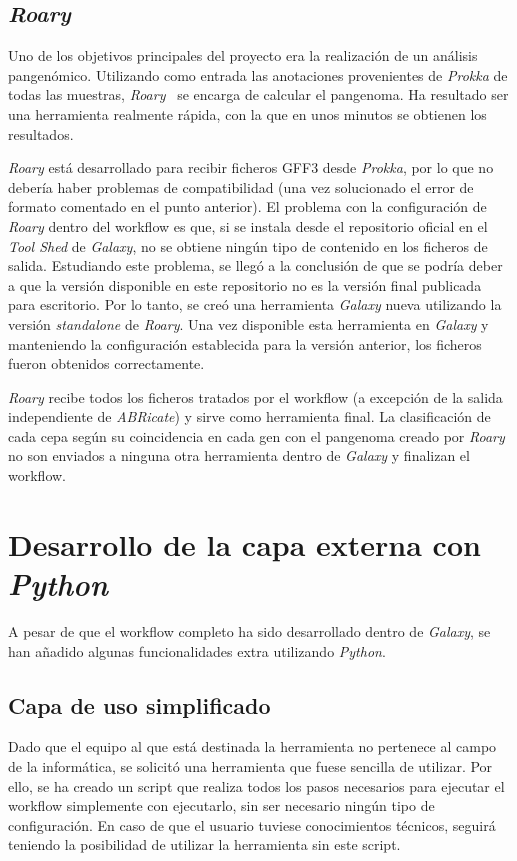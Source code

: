 \subsection{\itshape{Roary}}
Uno de los objetivos principales del proyecto era la realización de un análisis pangenómico. Utilizando como entrada las anotaciones provenientes de \textit{Prokka} de todas las muestras, \textit{Roary}~\cite{Page2015} se encarga de calcular el pangenoma. Ha resultado ser una herramienta realmente rápida, con la que en unos minutos se obtienen los resultados.

\textit{Roary} está desarrollado para recibir ficheros GFF3 desde \textit{Prokka}, por lo que no debería haber problemas de compatibilidad (una vez solucionado el error de formato comentado en el punto anterior). El problema con la configuración de \textit{Roary} dentro del workflow es que, si se instala desde el repositorio oficial en el \textit{Tool Shed} de \textit{Galaxy}, no se obtiene ningún tipo de contenido en los ficheros de salida. Estudiando este problema, se llegó a la conclusión de que se podría deber a que la versión disponible en este repositorio no es la versión final publicada para escritorio. Por lo tanto, se creó una herramienta \textit{Galaxy} nueva utilizando la versión \textit{standalone} de \textit{Roary}. Una vez disponible esta herramienta en \textit{Galaxy} y manteniendo la configuración establecida para la versión anterior, los ficheros fueron obtenidos correctamente.

\textit{Roary} recibe todos los ficheros tratados por el workflow (a excepción de la salida independiente de \textit{ABRicate}) y sirve como herramienta final. La clasificación de cada cepa según su coincidencia en cada gen con el pangenoma creado por \textit{Roary} no son enviados a ninguna otra herramienta dentro de \textit{Galaxy} y finalizan el workflow.


\section{Desarrollo de la capa externa con \itshape{Python}}
A pesar de que el workflow completo ha sido desarrollado dentro de \textit{Galaxy}, se han añadido algunas funcionalidades extra utilizando \textit{Python}.

\subsection{Capa de uso simplificado}
Dado que el equipo al que está destinada la herramienta no pertenece al campo de la informática, se solicitó una herramienta que fuese sencilla de utilizar. Por ello, se ha creado un script que realiza todos los pasos necesarios para ejecutar el workflow simplemente con ejecutarlo, sin ser necesario ningún tipo de configuración. En caso de que el usuario tuviese conocimientos técnicos, seguirá teniendo la posibilidad de utilizar la herramienta sin este script.

